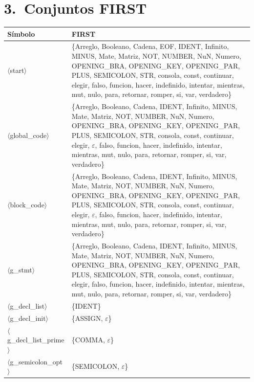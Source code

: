 \documentclass[10pt]{article}
\begin{document}
\section*{3.\ Conjuntos FIRST}
{\footnotesize
\begin{longtable}{@{} p{3.5cm} p{13cm} @{}}
  \toprule
  \textbf{Símbolo} & \textbf{FIRST} \\
  \midrule \endhead
  \parbox[t]{3.3cm}{\raggedright$\langle$start$\rangle$} & \{Arreglo, Booleano, Cadena, EOF, IDENT, Infinito, MINUS, Mate, Matriz, NOT, NUMBER, NuN, Numero, OPENING\_BRA, OPENING\_KEY, OPENING\_PAR, PLUS, SEMICOLON, STR, consola, const, continuar, elegir, falso, funcion, hacer, indefinido, intentar, mientras, mut, nulo, para, retornar, romper, si, var, verdadero\} \\
  \parbox[t]{3.3cm}{\raggedright$\langle$global\_\allowbreak{}code$\rangle$} & \{Arreglo, Booleano, Cadena, IDENT, Infinito, MINUS, Mate, Matriz, NOT, NUMBER, NuN, Numero, OPENING\_BRA, OPENING\_KEY, OPENING\_PAR, PLUS, SEMICOLON, STR, consola, const, continuar, elegir, $\varepsilon$, falso, funcion, hacer, indefinido, intentar, mientras, mut, nulo, para, retornar, romper, si, var, verdadero\} \\
  \parbox[t]{3.3cm}{\raggedright$\langle$block\_\allowbreak{}code$\rangle$} & \{Arreglo, Booleano, Cadena, IDENT, Infinito, MINUS, Mate, Matriz, NOT, NUMBER, NuN, Numero, OPENING\_BRA, OPENING\_KEY, OPENING\_PAR, PLUS, SEMICOLON, STR, consola, const, continuar, elegir, $\varepsilon$, falso, funcion, hacer, indefinido, intentar, mientras, mut, nulo, para, retornar, romper, si, var, verdadero\} \\
  \parbox[t]{3.3cm}{\raggedright$\langle$g\_\allowbreak{}stmt$\rangle$} & \{Arreglo, Booleano, Cadena, IDENT, Infinito, MINUS, Mate, Matriz, NOT, NUMBER, NuN, Numero, OPENING\_BRA, OPENING\_KEY, OPENING\_PAR, PLUS, SEMICOLON, STR, consola, const, continuar, elegir, falso, funcion, hacer, indefinido, intentar, mientras, mut, nulo, para, retornar, romper, si, var, verdadero\} \\
  \parbox[t]{3.3cm}{\raggedright$\langle$g\_\allowbreak{}decl\_\allowbreak{}list$\rangle$} & \{IDENT\} \\
  \parbox[t]{3.3cm}{\raggedright$\langle$g\_\allowbreak{}decl\_\allowbreak{}init$\rangle$} & \{ASSIGN, $\varepsilon$\} \\
  \parbox[t]{3.3cm}{\raggedright$\langle$g\_\allowbreak{}decl\_\allowbreak{}list\_\allowbreak{}prime$\rangle$} & \{COMMA, $\varepsilon$\} \\
  \parbox[t]{3.3cm}{\raggedright$\langle$g\_\allowbreak{}semicolon\_\allowbreak{}opt$\rangle$} & \{SEMICOLON, $\varepsilon$\} \\

\end{longtable}}
\end{document}
